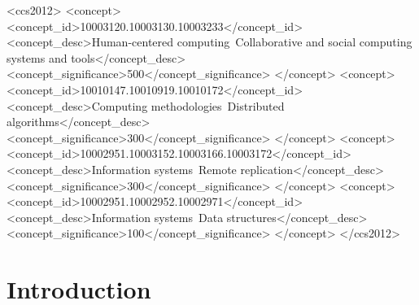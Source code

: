 \documentclass[sigplan,natbib=false,review]{acmart}
\begin{document}
\begin{CCSXML}
<ccs2012>
   <concept>
       <concept_id>10003120.10003130.10003233</concept_id>
       <concept_desc>Human-centered computing~Collaborative and social computing systems and tools</concept_desc>
       <concept_significance>500</concept_significance>
       </concept>
   <concept>
       <concept_id>10010147.10010919.10010172</concept_id>
       <concept_desc>Computing methodologies~Distributed algorithms</concept_desc>
       <concept_significance>300</concept_significance>
       </concept>
   <concept>
       <concept_id>10002951.10003152.10003166.10003172</concept_id>
       <concept_desc>Information systems~Remote replication</concept_desc>
       <concept_significance>300</concept_significance>
       </concept>
   <concept>
       <concept_id>10002951.10002952.10002971</concept_id>
       <concept_desc>Information systems~Data structures</concept_desc>
       <concept_significance>100</concept_significance>
       </concept>
 </ccs2012>
\end{CCSXML}




\maketitle

\section{Introduction}\label{sec:introduction}
\end{document}
